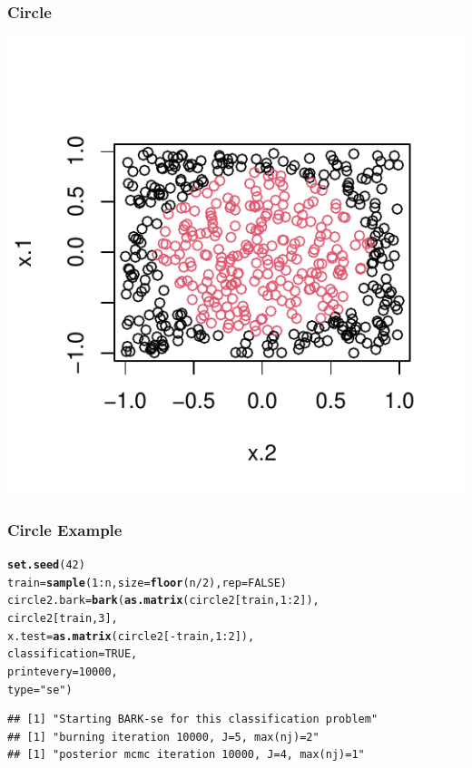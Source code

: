 \documentclass[]{beamer}\usepackage[]{graphicx}\usepackage[]{color}
\makeatletter
\def\maxwidth{ %
  \ifdim\Gin@nat@width>\linewidth
    \linewidth
  \else
    \Gin@nat@width
  \fi
}
\newcommand{\hlnum}[1]{\textcolor[rgb]{0.686,0.059,0.569}{#1}}%
\newcommand{\hlstr}[1]{\textcolor[rgb]{0.192,0.494,0.8}{#1}}%
\newcommand{\hlopt}[1]{\textcolor[rgb]{0,0,0}{#1}}%
\newcommand{\hlstd}[1]{\textcolor[rgb]{0.345,0.345,0.345}{#1}}%
\newcommand{\hlkwb}[1]{\textcolor[rgb]{0.69,0.353,0.396}{#1}}%
\newcommand{\hlkwc}[1]{\textcolor[rgb]{0.333,0.667,0.333}{#1}}%
\newcommand{\hlkwd}[1]{\textcolor[rgb]{0.737,0.353,0.396}{\textbf{#1}}}%
\newenvironment{kframe}{%
 \def\at@end@of@kframe{}%
 \ifinner\ifhmode%
  \def\at@end@of@kframe{\end{minipage}}%
  \begin{minipage}{\columnwidth}%
 \fi\fi%
 \def\FrameCommand##1{\hskip\@totalleftmargin \hskip-\fboxsep
 \colorbox{shadecolor}{##1}\hskip-\fboxsep
     \hskip-\linewidth \hskip-\@totalleftmargin \hskip\columnwidth}%
 \MakeFramed {\advance\hsize-\width
   \@totalleftmargin\z@ \linewidth\hsize
   \@setminipage}}%
 {\par\unskip\endMakeFramed%
 \at@end@of@kframe}
\newenvironment{knitrout}{}{} %
\makeatother
\begin{document}
\begin{frame}[fragile] \frametitle{Circle}
\begin{knitrout}
\color{fgcolor}
\includegraphics[width=\maxwidth]{figure/r-1} 
\end{knitrout}

\end{frame}

\begin{frame}[fragile] \frametitle{Circle Example}

\begin{knitrout}
\color{fgcolor}\begin{kframe}
\begin{alltt}
\hlkwd{set.seed}\hlstd{(}\hlnum{42}\hlstd{)}
\hlstd{train} \hlkwb{=} \hlkwd{sample}\hlstd{(}\hlnum{1}\hlopt{:}\hlstd{n,} \hlkwc{size} \hlstd{=} \hlkwd{floor}\hlstd{(n}\hlopt{/}\hlnum{2}\hlstd{),} \hlkwc{rep}\hlstd{=}\hlnum{FALSE}\hlstd{)}
\hlstd{circle2.bark} \hlkwb{=} \hlkwd{bark}\hlstd{(}\hlkwd{as.matrix}\hlstd{(circle2[train,} \hlnum{1}\hlopt{:}\hlnum{2}\hlstd{]),}
                    \hlstd{circle2[train,} \hlnum{3}\hlstd{],}
                    \hlkwc{x.test} \hlstd{=} \hlkwd{as.matrix}\hlstd{(circle2[}\hlopt{-}\hlstd{train,} \hlnum{1}\hlopt{:}\hlnum{2}\hlstd{]),}
                    \hlkwc{classification} \hlstd{=} \hlnum{TRUE}\hlstd{,}
                    \hlkwc{printevery} \hlstd{=} \hlnum{10000}\hlstd{,}
                    \hlkwc{type}\hlstd{=}\hlstr{"se"}\hlstd{)}
\end{alltt}
\begin{verbatim}
## [1] "Starting BARK-se for this classification problem"
## [1] "burning iteration 10000, J=5, max(nj)=2"
## [1] "posterior mcmc iteration 10000, J=4, max(nj)=1"
\end{verbatim}
\end{kframe}
\end{knitrout}
\end{frame}
\end{document}
